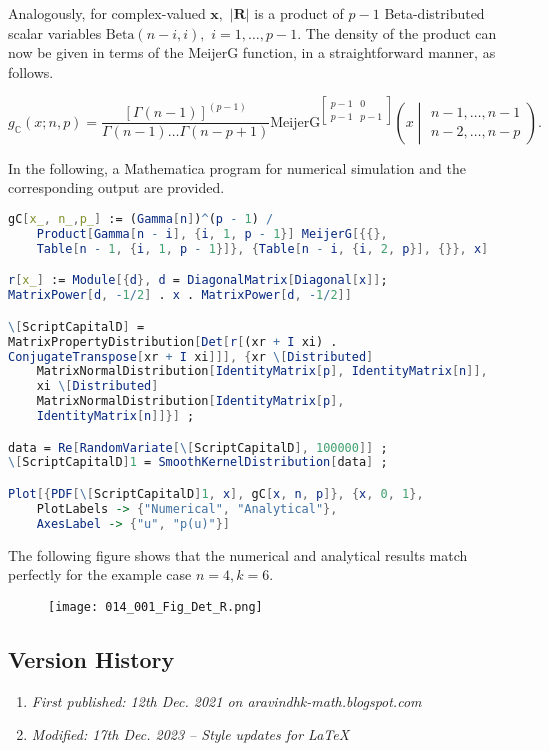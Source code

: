 Analogously, for complex-valued $\boldsymbol{x},$ $|\boldsymbol{R}|$ is a product of $p-1$ Beta-distributed scalar variables $\mathrm{Beta}(n-i,i),$  $i=1,\dots,p-1.$ The density of the product can now be given in terms of the $\mathrm{MeijerG}$ function, in a straightforward manner, as follows.

$$g_\mathbb{C}(x;n,p) = \frac{\left[\Gamma(n-1)\right]^{(p-1)} }{\Gamma(n-1)\dots\Gamma(n-p+1)} \mathrm{MeijerG}^{\begin{bmatrix}p-1 & 0 \\ p-1 & p-1\end{bmatrix}}\left(x\middle|\begin{matrix}n-1,\dots,n-1\\ n-2,\dots,n-p\end{matrix}\right).$$

In the following, a Mathematica program for numerical simulation and the corresponding output are provided.

\begin{lstlisting}[language=Mathematica,numbers=none]
gC[x_, n_,p_] := (Gamma[n])^(p - 1) / 
	Product[Gamma[n - i], {i, 1, p - 1}] MeijerG[{{},
	Table[n - 1, {i, 1, p - 1}]}, {Table[n - i, {i, 2, p}], {}}, x]

r[x_] := Module[{d}, d = DiagonalMatrix[Diagonal[x]]; 
MatrixPower[d, -1/2] . x . MatrixPower[d, -1/2]]

\[ScriptCapitalD] =
MatrixPropertyDistribution[Det[r[(xr + I xi) .
ConjugateTranspose[xr + I xi]]], {xr \[Distributed]
	MatrixNormalDistribution[IdentityMatrix[p], IdentityMatrix[n]],
	xi \[Distributed]
	MatrixNormalDistribution[IdentityMatrix[p],
	IdentityMatrix[n]]}] ;

data = Re[RandomVariate[\[ScriptCapitalD], 100000]] ;
\[ScriptCapitalD]1 = SmoothKernelDistribution[data] ;

Plot[{PDF[\[ScriptCapitalD]1, x], gC[x, n, p]}, {x, 0, 1},
	PlotLabels -> {"Numerical", "Analytical"},
	AxesLabel -> {"u", "p(u)"}]
\end{lstlisting}

The following figure shows that the numerical and analytical results match perfectly for the example case $n=4, k=6.$

\begin{figure}[H]
	\centering
	\texttt{[image: 014\_001\_Fig\_Det\_R.png]}
\end{figure}

\subsection{Version History}
\begin{enumerate}
	\item \emph{First published: 12th Dec. 2021 on aravindhk-math.blogspot.com}
	\item \emph{Modified: 17th Dec. 2023 -- Style updates for \LaTeX}
\end{enumerate}
